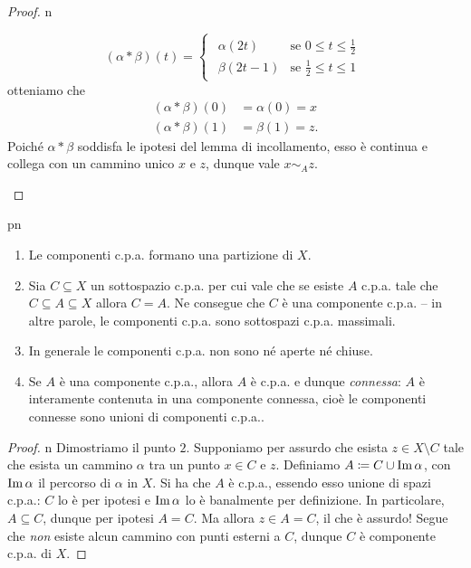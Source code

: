 \begin{proof}{n}
\begin{itemize}
	\begin{equation*}
	\left(\alpha\ast\beta\right)\left(t\right)=\begin{cases}
		\begin{array}{lc}
					\alpha\left(2t\right) & \text{se }0\leq t\leq \frac{1}{2}\\
			\beta\left(2t-1\right) & \text{se }\frac{1}{2}\leq t\leq 1	
		\end{array}
	\end{cases}
\end{equation*}
otteniamo che
\begin{align*}
	\left(\alpha\ast\beta\right)\left(0\right)&=\alpha\left(0\right)=x\\
	\left(\alpha\ast\beta\right)\left(1\right)&=\beta\left(1\right)=z.
\end{align*}
Poiché $\alpha\ast\beta$ soddisfa le ipotesi del lemma di incollamento, esso è continua e collega con un cammino unico $x$ e $z$, dunque vale $x\sim_A z$.\qedhere
	\end{itemize}
\end{proof}
\begin{remark}{pn}~{}
	\begin{enumerate}
		\item Le componenti c.p.a. formano una partizione di $X$.
		\item Sia $C\subseteq X$ un sottospazio c.p.a. per cui vale che se esiste $A$ c.p.a. tale che $C\subseteq A\subseteq X$ allora $C=A$. Ne consegue che $C$ è una componente c.p.a. -- in altre parole, le componenti c.p.a. sono sottospazi c.p.a. massimali.
		\item In generale le componenti c.p.a. non sono né aperte né chiuse.
		\item Se $A$ è una componente c.p.a., allora $A$ è c.p.a. e dunque \textit{connessa}: $A$ è interamente contenuta in una componente connessa, cioè le componenti connesse sono unioni di componenti c.p.a..
	\end{enumerate}
\end{remark}
\begin{proof}{n}
	Dimostriamo il punto $2$. Supponiamo per assurdo che esista $z\in X\setminus C$ tale che esista un cammino $\alpha$ tra un punto $x\in C$ e $z$. Definiamo $A\coloneqq C\cup \operatorname{Im}\alpha$, con $\operatorname{Im}\alpha$ il percorso di $\alpha$ in $X$. Si ha che $A$ è c.p.a., essendo esso unione di spazi c.p.a.: $C$ lo è per ipotesi e $\operatorname{Im}\alpha$ lo è banalmente per definizione. In particolare, $A\subseteq C$, dunque per ipotesi $A=C$. Ma allora $z\in A=C$, il che è assurdo! Segue che \textit{non} esiste alcun cammino con punti esterni a $C$, dunque $C$ è componente c.p.a. di $X$.\qedhere
\end{proof}
